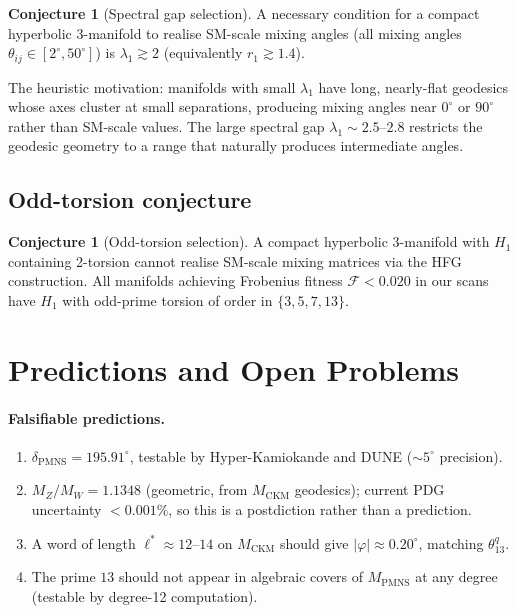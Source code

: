 \documentclass[11pt,a4paper]{article}
\theoremstyle{definition}
\newtheorem{conjecture}[theorem]{Conjecture}
\theoremstyle{remark}
\newcommand{\MPMNS}{M_{\mathrm{PMNS}}}
\newcommand{\MCKM}{M_{\mathrm{CKM}}}
\newcommand{\degr}{^{\circ}}
\begin{document}
\begin{conjecture}[Spectral gap selection]
\label{conj:gap}
A necessary condition for a compact hyperbolic 3-manifold to
realise SM-scale mixing angles (all mixing angles
$\theta_{ij} \in [2\degr, 50\degr]$) is $\lambda_1 \gtrsim 2$
(equivalently $r_1 \gtrsim 1.4$).
\end{conjecture}

The heuristic motivation: manifolds with small $\lambda_1$ have
long, nearly-flat geodesics whose axes cluster at small separations,
producing mixing angles near $0\degr$ or $90\degr$ rather than SM-scale
values.
The large spectral gap $\lambda_1 \sim 2.5$--$2.8$ restricts the
geodesic geometry to a range that naturally produces intermediate angles.

\subsection{Odd-torsion conjecture}

\begin{conjecture}[Odd-torsion selection]
\label{conj:torsion}
A compact hyperbolic 3-manifold with $H_1$ containing 2-torsion cannot
realise SM-scale mixing matrices via the HFG construction.
All manifolds achieving Frobenius fitness $\mathcal{F}<0.020$ in our
scans have $H_1$ with odd-prime torsion of order in $\{3,5,7,13\}$.
\end{conjecture}

\section{Predictions and Open Problems}
\label{sec:predictions}

\paragraph{Falsifiable predictions.}
\begin{enumerate}[(1)]
\item $\delta_{\mathrm{PMNS}} = 195.91\degr$, testable by
  Hyper-Kamiokande and DUNE ($\sim5\degr$ precision).
\item $M_Z/M_W = 1.1348$ (geometric, from $\MCKM$ geodesics);
  current PDG uncertainty $<0.001\%$, so this is a postdiction
  rather than a prediction.
\item A word of length $\ell^* \approx 12$--$14$ on $\MCKM$ should
  give $|\varphi| \approx 0.20\degr$, matching $\theta_{13}^q$.
\item The prime $13$ should not appear in algebraic covers of $\MPMNS$
  at any degree (testable by degree-12 computation).
\end{enumerate}
\end{document}
